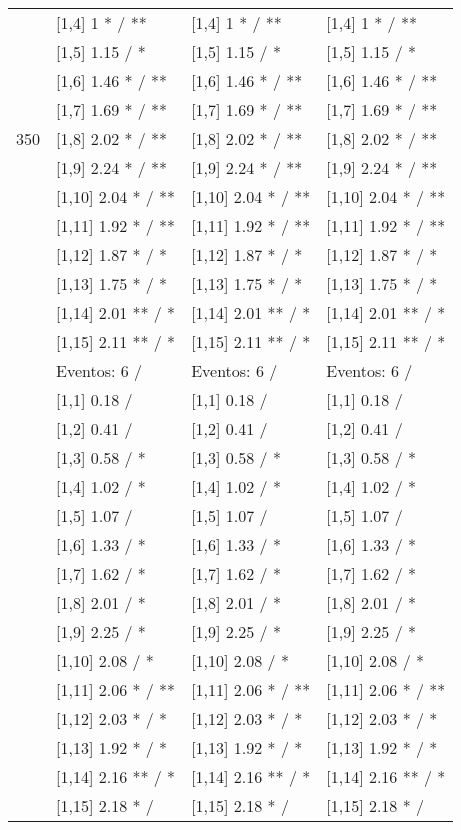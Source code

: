 \begin{table}
\begin{tabular}[t]{llll}
 & {}[1,4] 1 * / ** & {}[1,4] 1 * / ** & {}[1,4] 1 * / **\\
 & {}[1,5] 1.15  / * & {}[1,5] 1.15  / * & {}[1,5] 1.15  / *\\
 & {}[1,6] 1.46 * / ** & {}[1,6] 1.46 * / ** & {}[1,6] 1.46 * / **\\
 & {}[1,7] 1.69 * / ** & {}[1,7] 1.69 * / ** & {}[1,7] 1.69 * / **\\
350 & {}[1,8] 2.02 * / ** & {}[1,8] 2.02 * / ** & {}[1,8] 2.02 * / **\\
\addlinespace
 & {}[1,9] 2.24 * / ** & {}[1,9] 2.24 * / ** & {}[1,9] 2.24 * / **\\
 & {}[1,10] 2.04 * / ** & {}[1,10] 2.04 * / ** & {}[1,10] 2.04 * / **\\
 & {}[1,11] 1.92 * / ** & {}[1,11] 1.92 * / ** & {}[1,11] 1.92 * / **\\
 & {}[1,12] 1.87 * / * & {}[1,12] 1.87 * / * & {}[1,12] 1.87 * / *\\
 & {}[1,13] 1.75 * / * & {}[1,13] 1.75 * / * & {}[1,13] 1.75 * / *\\
\addlinespace
 & {}[1,14] 2.01 ** / * & {}[1,14] 2.01 ** / * & {}[1,14] 2.01 ** / *\\
 & {}[1,15] 2.11 ** / * & {}[1,15] 2.11 ** / * & {}[1,15] 2.11 ** / *\\
 & Eventos:  6 / & Eventos:  6 / & Eventos:  6 /\\
 & {}[1,1] 0.18  / & {}[1,1] 0.18  / & {}[1,1] 0.18  /\\
 & {}[1,2] 0.41  / & {}[1,2] 0.41  / & {}[1,2] 0.41  /\\
\addlinespace
 & {}[1,3] 0.58  / * & {}[1,3] 0.58  / * & {}[1,3] 0.58  / *\\
 & {}[1,4] 1.02  / * & {}[1,4] 1.02  / * & {}[1,4] 1.02  / *\\
 & {}[1,5] 1.07  / & {}[1,5] 1.07  / & {}[1,5] 1.07  /\\
 & {}[1,6] 1.33  / * & {}[1,6] 1.33  / * & {}[1,6] 1.33  / *\\
 & {}[1,7] 1.62  / * & {}[1,7] 1.62  / * & {}[1,7] 1.62  / *\\
\addlinespace
500 & {}[1,8] 2.01  / * & {}[1,8] 2.01  / * & {}[1,8] 2.01  / *\\
 & {}[1,9] 2.25  / * & {}[1,9] 2.25  / * & {}[1,9] 2.25  / *\\
 & {}[1,10] 2.08  / * & {}[1,10] 2.08  / * & {}[1,10] 2.08  / *\\
 & {}[1,11] 2.06 * / ** & {}[1,11] 2.06 * / ** & {}[1,11] 2.06 * / **\\
 & {}[1,12] 2.03 * / * & {}[1,12] 2.03 * / * & {}[1,12] 2.03 * / *\\
\addlinespace
 & {}[1,13] 1.92 * / * & {}[1,13] 1.92 * / * & {}[1,13] 1.92 * / *\\
 & {}[1,14] 2.16 ** / * & {}[1,14] 2.16 ** / * & {}[1,14] 2.16 ** / *\\
 & {}[1,15] 2.18 * / & {}[1,15] 2.18 * / & {}[1,15] 2.18 * /\\
\bottomrule
\end{tabular}
\end{table}
